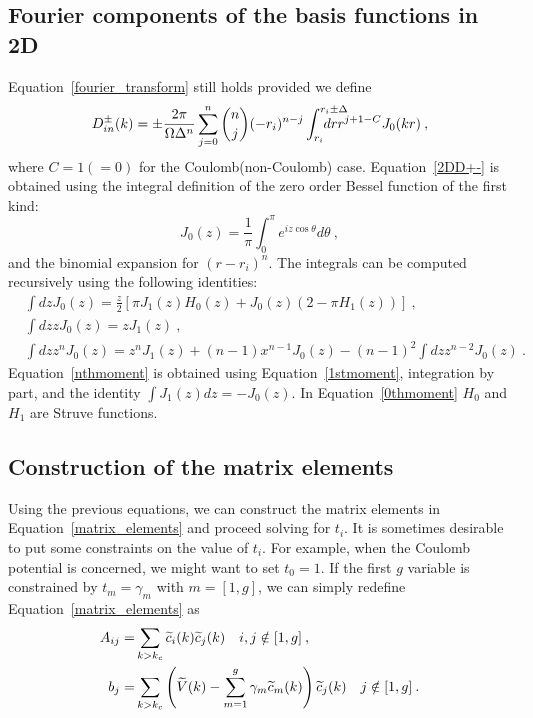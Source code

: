 \subsection{Fourier components of the basis functions in 2D}
Equation~\ref{fourier_transform} still holds provided we define  
\begin{equation}
D^\pm_{in}(k)=\pm\frac{2\pi}{\Omega \Delta^n} \sum_{j=0}^n \binom{n}{j}
(-r_i)^{n-j}\int_{r_i}^{r_i\pm \Delta}\negthickspace \negthickspace 
\negthickspace \negthickspace \negthickspace \negthickspace \negthickspace 
dr r^{j+1-C} J_0(kr)\:,
\label{2DD+-}
\end{equation}
where $C=1(=0)$ for the Coulomb(non-Coulomb) case.
Equation~\ref{2DD+-} is obtained using the integral definition of the 
zero order Bessel function of the first kind: 
\begin{equation}
J_0(z)=\frac{1}{\pi}\int_0^\pi e^{iz\cos\theta}d\theta\:,
\end{equation}
and the binomial expansion for $(r-r_i)^n$.
The integrals can be computed recursively using the following identities:
\begin{align}
&\int dz J_0(z)=\frac{z}{2}\left[\pi J_1(z)H_0(z)+J_0(z)(2-\pi H_1(z))\right]
\label{0thmoment}\:,\\
&\int dz z J_0(z)= z J_1(z)
\label{1stmoment}\:,\\
&\int dz z^n J_0(z)= z^nJ_1(z)+(n-1)x^{n-1}J_0(z)
-(n-1)^2\int dz z^{n-2} J_0(z)\:.
\label{nthmoment}
\end{align}
Equation~\ref{nthmoment} is obtained using Equation~\ref{1stmoment}, integration by part, and 
the identity $\int J_1(z) dz =-J_0(z)$. In Equation~\ref{0thmoment} $H_0$ and $H_1$ are Struve functions.

\subsection{Construction of the matrix elements}
Using the previous equations, we can construct the matrix elements in Equation~\ref{matrix_elements}
and proceed solving for $t_i$. It is sometimes desirable to put some constraints
on the value of $t_i$. For example, when the Coulomb potential is concerned, we might 
want to set $t_{0}=1$. If the first $g$ variable is constrained by $t_{m}=\gamma_m$ 
with $m=[1,g]$, we can simply redefine Equation~\ref{matrix_elements} as
\begin{equation}
\begin{split}
A_{ij}=&\sum_{k>k_c} \widetilde{c}_i(k)\widetilde{c}_j(k)  \quad i,j\notin[1,g]\:, \\
b_j=&\sum_{k>k_c} \left(\widetilde{V}(k)-\sum_{m=1}^g \gamma_m \widetilde{c}_m(k)\right)\widetilde{c}_j(k)\quad j\notin[1,g]\:.
\end{split}
\label{modified_matrix_elements}
\end{equation}



